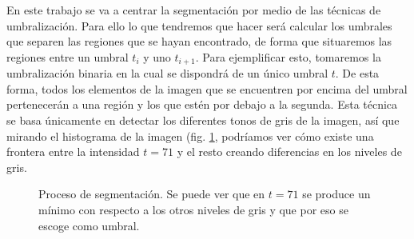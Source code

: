 En este trabajo se va a centrar la segmentación por medio de las técnicas de umbralización. Para ello lo que tendremos que hacer será calcular los umbrales que separen las regiones que se hayan encontrado, de forma que situaremos las regiones entre un umbral $t_{i}$ y uno $t_{i+1}$. Para ejemplificar esto, tomaremos la umbralización binaria en la cual se dispondrá de un único umbral $t$. De esta forma, todos los elementos de la imagen que se encuentren por encima del umbral pertenecerán a una región  y los que estén por debajo a la segunda. Esta técnica se basa únicamente en detectar los diferentes tonos de gris de la imagen, así que mirando el histograma de la imagen (fig. \ref{img:rice}, podríamos ver cómo existe una frontera entre la intensidad $t=71$ y el resto creando diferencias en los niveles de gris. \cite{art:refbarrenechea}

\begin{figure}
\centering
	\quad
	\quad
	\caption{Proceso de segmentación. Se puede ver que en $t=71$ se produce un mínimo con respecto a los otros niveles de gris y que por eso se escoge como umbral.}
	\label{img:rice}
\end{figure}


